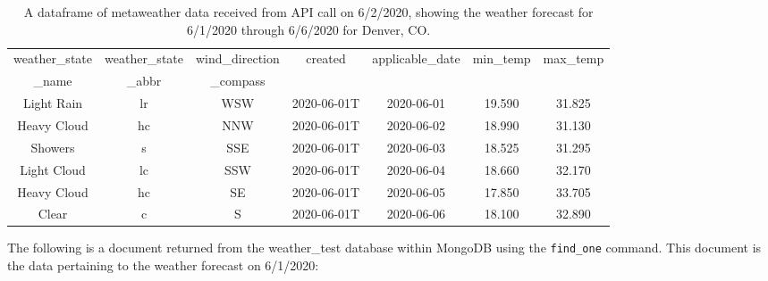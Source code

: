 \documentclass[]{article}
\newcommand{\code}[1]{\colorbox{light-gray}{\texttt{#1}}}
\begin{document}
\begin{table}[!ht]
	\begin{center}
		\caption{A dataframe of metaweather data received from API call on 6/2/2020, showing the weather forecast for 6/1/2020 through 6/6/2020 for Denver, CO.}
		\label{tab:table1}
		\begin{tabular}{|c|c|c|c|c|c|c|}
			\hline
			weather\_state&weather\_state&wind\_direction&created&applicable\_date&min\_temp&max\_temp\\
			\_name&\_abbr&\_compass&&&&\\
			\hline
		Light Rain&	lr	&WSW&	2020-06-01T&	2020-06-01&	19.590&	31.825\\
		Heavy Cloud&	hc	&NNW	&2020-06-01T&	2020-06-02&	18.990&	31.130\\
		Showers	&s	&SSE	&2020-06-01T&	2020-06-03	&18.525&	31.295\\
		Light Cloud&	lc	&SSW	&2020-06-01T&	2020-06-04&	18.660&	32.170\\
		Heavy Cloud	&hc	&SE&	2020-06-01T	&2020-06-05	&17.850&	33.705\\
		Clear&	c&	S	&2020-06-01T&	2020-06-06&	18.100&	32.890\\
			\hline
		\end{tabular}
	\end{center}
\end{table}
The following is a document returned from the weather\_test database within MongoDB using the \code{find\_one} command.  This document is the data pertaining to the weather forecast on 6/1/2020:
\end{document}
